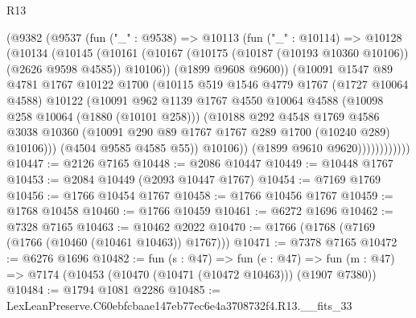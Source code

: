 \begin{lexlean}{R13}
\begin{coremodule}
                  (@9382
                    (@9537
                      (fun ("_" : @9538) =>
                      @10113
                        (fun ("_" : @10114) =>
                        @10128
                          (@10134
                            (@10145
                              (@10161
                                (@10167
                                  (@10175 (@10187 (@10193 @10360 @10106)) (@2626 @9598 @4585))
                                  @10106))
                              (@1899 @9608 @9600))
                            (@10091
                              @1547
                              @89
                              @4781
                              @1767
                              @10122
                              @1700
                              (@10115
                                @519
                                @1546
                                @4779
                                @1767
                                (@1727 @10064 @4588)
                                @10122
                                (@10091
                                  @962
                                  @1139
                                  @1767
                                  @4550
                                  @10064
                                  @4588
                                  (@10098 @258 @10064 (@1880 (@10101 @258)))
                                  (@10188
                                    @292
                                    @4548
                                    @1769
                                    @4586
                                    @3038
                                    @10360
                                    (@10091 @290 @89 @1767 @1767 @289 @1700 (@10240 @289) @10106)))
                                (@4504 @9585 @4585 @55))
                              @10106))
                          (@1899 @9610 @9620))))))))))))
@10447 := @2126 @7165
@10448 := @2086 @10447
@10449 := @10448 @1767
@10453 := @2084 @10449 (@2093 @10447 @1767)
@10454 := @7169 @1769
@10456 := @1766 @10454 @1767
@10458 := @1766 @10456 @1767
@10459 := @1768 @10458
@10460 := @1766 @10459
@10461 := @6272 @1696
@10462 := @7328 @7165
@10463 := @10462 @2022
@10470 := @1766 (@1768 (@7169 (@1766 (@10460 (@10461 @10463)) @1767)))
@10471 := @7378 @7165
@10472 := @6276 @1696
@10482 := fun (s : @47) =>
  fun (e : @47) => fun (m : @47) => @7174 (@10453 (@10470 (@10471 (@10472 @10463))) (@1907 @7380))
@10484 := @1794 @1081 @2286
@10485 := LexLeanPreserve.C60ebfcbaae147eb77ec6e4a3708732f4.R13.__fits_33

\end{coremodule}
\end{lexlean}
